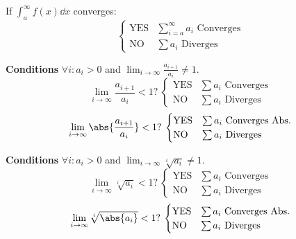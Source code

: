 \documentclass{article}
\begin{document}
\begin{multicols}{2}
\begin{tcolorboxcols}[title={Integral Test}]
        \noindent If \(\displaystyle\int_a^\infty f(x) \dd{x}\) converges:
        \begin{equation*}
            \begin{cases}
                \text{YES} & \text{\(\sum_{i=a}^\infty a_i\) Converges} \\
                \text{NO}  & \text{\(\sum a_i\) Diverges}
            \end{cases}
        \end{equation*}
    \end{tcolorboxcols}
    \begin{tcolorboxcols}[title={Ratio Test}]
        \textbf{Conditions} \(\forall i:a_i>0\) and \(\displaystyle \lim_{i\to\infty}\frac{a_{i+1}}{a_i}\neq 1\).
        \begin{equation*}
            \text{\(\lim_{i\to\infty}\frac{a_{i+1}}{a_i} < 1\)?}\:
            \begin{cases}
                \text{YES} & \text{\(\sum a_i\) Converges} \\
                \text{NO}  & \text{\(\sum a_i\) Diverges}
            \end{cases}
        \end{equation*}
        \begin{equation*}
            \text{\(\lim_{i\to\infty}\abs{\frac{a_{i+1}}{a_i}} < 1\)?}\:
            \begin{cases}
                \text{YES} & \text{\(\sum a_i\) Converges Abs.} \\
                \text{NO}  & \text{\(\sum a_i\) Diverges}
            \end{cases}
        \end{equation*}
    \end{tcolorboxcols}
    \begin{tcolorboxcols}[title={Root Test}]
        \textbf{Conditions} \(\forall i:a_i>0\) and \(\displaystyle \lim_{i\to\infty}\sqrt[i]{a_i}\neq 1\).
        \begin{equation*}
            \text{\(\lim_{i\to\infty}\sqrt[i]{a_i} < 1\)?}\:
            \begin{cases}
                \text{YES} & \text{\(\sum a_i\) Converges} \\
                \text{NO}  & \text{\(\sum a_i\) Diverges}
            \end{cases}
        \end{equation*}
        \begin{equation*}
            \text{\(\lim_{i\to\infty}\sqrt[i]{\abs{a_i}} < 1\)?}\:
            \begin{cases}
                \text{YES} & \text{\(\sum a_i\) Converges Abs.} \\
                \text{NO}  & \text{\(\sum a_i\) Diverges}
            \end{cases}
        \end{equation*}
    \end{tcolorboxcols}
\end{multicols}
\pagebreak
%
\end{document}
